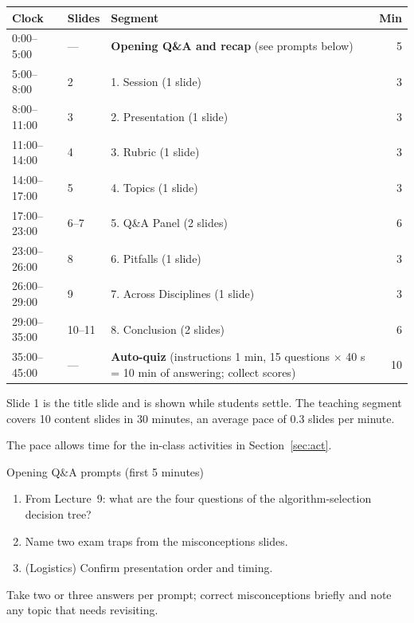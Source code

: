 \documentclass[11pt]{article}
\begin{document}
\begin{center}\small\renewcommand{\arraystretch}{1.2}\begin{tabularx}{\textwidth}{@{}l l X r@{}}\toprule\textbf{Clock} & \textbf{Slides} & \textbf{Segment} & \textbf{Min}\\\midrule

0:00--5:00 & --- & \textbf{Opening Q\&A and recap} (see prompts below) & 5\\

5:00--8:00 & 2 & 1. Session (1 slide) & 3\\

8:00--11:00 & 3 & 2. Presentation (1 slide) & 3\\

11:00--14:00 & 4 & 3. Rubric (1 slide) & 3\\

14:00--17:00 & 5 & 4. Topics (1 slide) & 3\\

17:00--23:00 & 6--7 & 5. Q\&A Panel (2 slides) & 6\\

23:00--26:00 & 8 & 6. Pitfalls (1 slide) & 3\\

26:00--29:00 & 9 & 7. Across Disciplines (1 slide) & 3\\

29:00--35:00 & 10--11 & 8. Conclusion (2 slides) & 6\\

35:00--45:00 & --- & \textbf{Auto-quiz} (instructions 1 min, 15 questions $\times$ 40 s = 10 min of answering; collect scores) & 10\\\bottomrule\end{tabularx}\end{center}

Slide 1 is the title slide and is shown while students settle. The teaching segment covers 10 content slides in 30 minutes, an average pace of 0.3 slides per minute. 

The pace allows time for the in-class activities in Section~\ref{sec:act}.

\begin{instr}{Opening Q\&A prompts (first 5 minutes)}\begin{enumerate}\item From Lecture~9: what are the four questions of the algorithm-selection decision tree?\item Name two exam traps from the misconceptions slides.\item (Logistics) Confirm presentation order and timing.\end{enumerate}Take two or three answers per prompt; correct misconceptions briefly and note any topic that needs revisiting.\end{instr}
\end{document}
